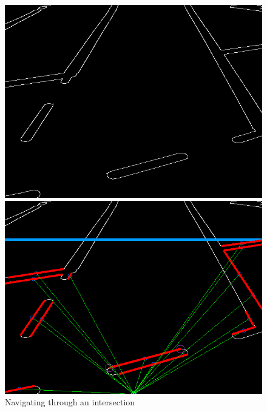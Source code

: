 \documentclass [10pt]{article}
\begin{document}
\begin{figure}
\centering
\begin{subfig}
  \centering
  \includegraphics[width=.4\linewidth]{figures/intersection3_c.png}
\end{subfig}%
\begin{subfig}
  \centering
  \includegraphics[width=.4\linewidth]{figures/intersection3_h.png}
\end{subfig}
\caption{Navigating through an intersection}
\label{fig:Fig6}

\end{figure}
\end{document}
